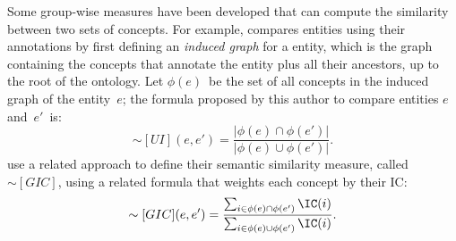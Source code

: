 Some group-wise measures have been developed that can compute the similarity between two sets of concepts. For example, \citet{Gentleman2007} compares entities using their annotations by first defining an \emph{induced graph} for a entity, which is the graph containing the concepts that annotate the entity plus all their ancestors, up to the root of the ontology. Let $\phi(e)$~be the set of all concepts in the induced graph of the entity~$e$; the formula proposed by this author to compare entities $e$ and~$e'$~is:
\begin{equation}
    \sim[UI](e,e') = \frac
        {\left\vert\phi(e)\cap\phi(e')\right\vert}
        {\left\vert\phi(e)\cup\phi(e')\right\vert}.
    \label{eq:simui}
\end{equation}
\citet{Pesquita2008} use a related approach to define their semantic similarity
measure, called~$\sim[GIC]$, using a related formula that weights each concept
by their IC:
\begin{equation}
    \sim[GIC](e,e') = \frac
        {\sum_{i\in\phi(e)\cap\phi(e')} \IC(i)}
        {\sum_{i\in\phi(e)\cup\phi(e')} \IC(i)}.
    \label{eq:simgic}
\end{equation}

